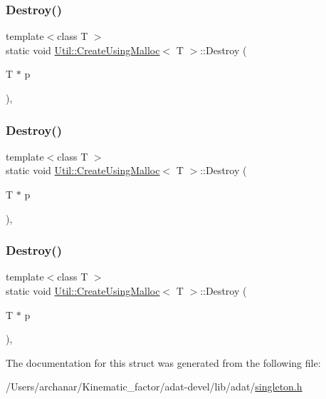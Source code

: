 \subsubsection{\texorpdfstring{Destroy()}{Destroy()}\hspace{0.1cm}{\footnotesize\ttfamily [1/3]}}
{\footnotesize\ttfamily template$<$class T $>$ \\
static void \mbox{\hyperlink{structUtil_1_1CreateUsingMalloc}{Util\+::\+Create\+Using\+Malloc}}$<$ T $>$\+::Destroy (\begin{DoxyParamCaption}\item[{T $\ast$}]{p }\end{DoxyParamCaption})\hspace{0.3cm}{\ttfamily [inline]}, {\ttfamily [static]}}

\mbox{\label{structUtil_1_1CreateUsingMalloc_a8197e99b6560b6b6ee323ec3176698f8}} 
\subsubsection{\texorpdfstring{Destroy()}{Destroy()}\hspace{0.1cm}{\footnotesize\ttfamily [2/3]}}
{\footnotesize\ttfamily template$<$class T $>$ \\
static void \mbox{\hyperlink{structUtil_1_1CreateUsingMalloc}{Util\+::\+Create\+Using\+Malloc}}$<$ T $>$\+::Destroy (\begin{DoxyParamCaption}\item[{T $\ast$}]{p }\end{DoxyParamCaption})\hspace{0.3cm}{\ttfamily [inline]}, {\ttfamily [static]}}

\mbox{\label{structUtil_1_1CreateUsingMalloc_a8197e99b6560b6b6ee323ec3176698f8}} 
\subsubsection{\texorpdfstring{Destroy()}{Destroy()}\hspace{0.1cm}{\footnotesize\ttfamily [3/3]}}
{\footnotesize\ttfamily template$<$class T $>$ \\
static void \mbox{\hyperlink{structUtil_1_1CreateUsingMalloc}{Util\+::\+Create\+Using\+Malloc}}$<$ T $>$\+::Destroy (\begin{DoxyParamCaption}\item[{T $\ast$}]{p }\end{DoxyParamCaption})\hspace{0.3cm}{\ttfamily [inline]}, {\ttfamily [static]}}



The documentation for this struct was generated from the following file\+:\begin{DoxyCompactItemize}
\item 
/\+Users/archanar/\+Kinematic\+\_\+factor/adat-\/devel/lib/adat/\mbox{\hyperlink{adat-devel_2lib_2adat_2singleton_8h}{singleton.\+h}}\end{DoxyCompactItemize}
